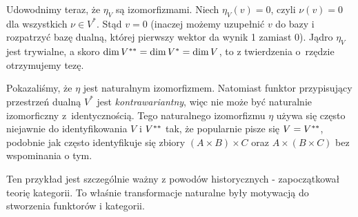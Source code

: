 {\begin{prof}
  Udowodnimy teraz, że $\eta_V$ są izomorfizmami. Niech $\eta_V(v) = 0$, czyli $\nu(v)=0$ dla wszystkich $\nu\in V^*$. Stąd $v=0$ (inaczej możemy uzupełnić $v$ do bazy i rozpatrzyć bazę dualną, której pierwszy wektor da wynik 1 zamiast 0). Jądro $\eta_V$ jest trywialne, a skoro $\dim {V}^{**} = \dim {V}^{*} = \dim V$, to z twierdzenia o~rzędzie otrzymujemy tezę.
\end{prof}

\begin{remk}
    Pokazaliśmy, że $\eta$ jest naturalnym izomorfizmem. Natomiast funktor przypisujący przestrzeń dualną $V^*$ jest \emph{kontrawariantny}, więc nie może być naturalnie izomorficzny z~identycznością. Tego naturalnego izomorfizmu $\eta$ używa się często niejawnie do identyfikowania $V$ i ${V}^{**}$ tak, że popularnie pisze się $V={V}^{**}$, podobnie jak często identyfikuje się zbiory $(A\times B)\times C$ oraz $A\times (B\times C)$ bez wspominania o tym.

    Ten przykład jest szczególnie ważny z powodów historycznych - zapoczątkował teorię kategorii. To właśnie transformacje naturalne były motywacją do stworzenia funktorów i kategorii.
\end{remk}
}
